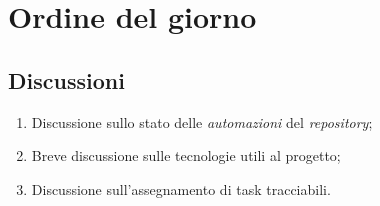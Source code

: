 \section{Ordine del giorno} \label{sec:agenda}
\subsection{Discussioni} \label{subsec:discussione}
\begin{enumerate}
    \item Discussione sullo stato delle \textit{automazioni} del \textit{repository};
    \item Breve discussione sulle tecnologie utili al progetto;
    \item Discussione sull'assegnamento di task tracciabili.
\end{enumerate}
